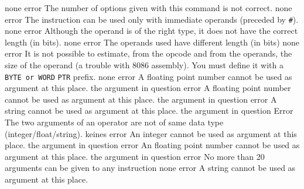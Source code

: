 \documentclass[12pt,twoside]{report}
\newcommand{\tty}[1]{{\tt #1}}
\begin{document}
\begin{description}
               {none}
               {error}
               {The number of options given with this command is not
                correct.}
               {none}
               {error}
               {The instruction can be used only with immediate operands
                (preceded by \tty{\#}).}
               {none}
               {error}
               {Although the operand is of the right type, it does not have
                the correct length (in bits).}
               {none}
               {error}
               {The operands used have different length (in bits)}
               {none}
               {error}
               {It is not possible to estimate, from the opcode and from
                the operands, the size of the operand (a trouble with
                8086 assembly). You must define it with a \tty{BYTE or WORD}
                \tty{PTR} prefix.}
               {none}
               {error}
               {A floating point number cannot be used as argument at this place.}
               {the argument in question}
               {error}
               {A floating point number cannot be used as argument at this place.}
               {the argument in question}
               {error}
               {A string cannot be used as argument at this place.}
               {the argument in question}
               {Error}
               {The two arguments of an operator are not of same
                data type (integer/\-float/\-string).}
               {keines}
               {error}
               {An integer cannot be used as argument at this place.}
               {the argument in question}
               {error}
               {An floating point number cannot be used as argument at this place.}
               {the argument in question}
               {error}
               {No more than 20 arguments can be given to any instruction}
               {none}
               {error}
               {A string cannot be used as argument at this place.}

\end{description}
\end{document}
